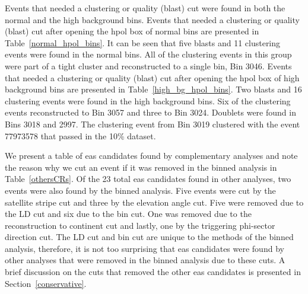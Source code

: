 Events that needed a clustering or quality (blast) cut were found in both the normal and the high background bins. 
Events that needed a clustering or quality (blast) cut after opening the \gls{hpol} box of normal bins are presented in Table~\ref{normal_hpol_bins}. 
It can be seen that five blasts and 11 clustering events were found in the normal bins. All of the clustering events in this group were part of a tight cluster and reconstructed to a single bin, Bin 3046. 
Events that needed a clustering or quality (blast) cut after opening the \gls{hpol} box of high background bins are presented in Table~\ref{high_bg_hpol_bins}. Two blasts and 16 clustering events were found in the high background bins. Six of the clustering events reconstructed to Bin 3057 and three to Bin 3024. Doublets were found in Bins 3018 and 2997. The clustering event from Bin 3019 clustered with the event 77973578 that passed in the 10\% dataset.

We present a table of \gls{eas} candidates found by complementary analyses and note the reason why we cut an event if it was removed in the binned analysis in Table~\ref{othersCRs}. Of the 23 total \gls{eas} candidates found in other analyses, two events were also found by the binned analysis. Five events were cut by the satellite stripe cut and three by the elevation angle cut. Five were removed due to the LD cut and six due to the bin cut. One was removed due to the reconstruction to continent cut and lastly, one by the triggering phi-sector direction cut. The LD cut and bin cut are unique to the methods of the binned analysis, therefore, it 
is not too surprising that \gls{eas} candidates were found by other analyses that were removed in the binned analysis due to these cuts. A brief discussion on the cuts that removed the other \gls{eas} candidates is presented in Section~\ref{conservative}. 




